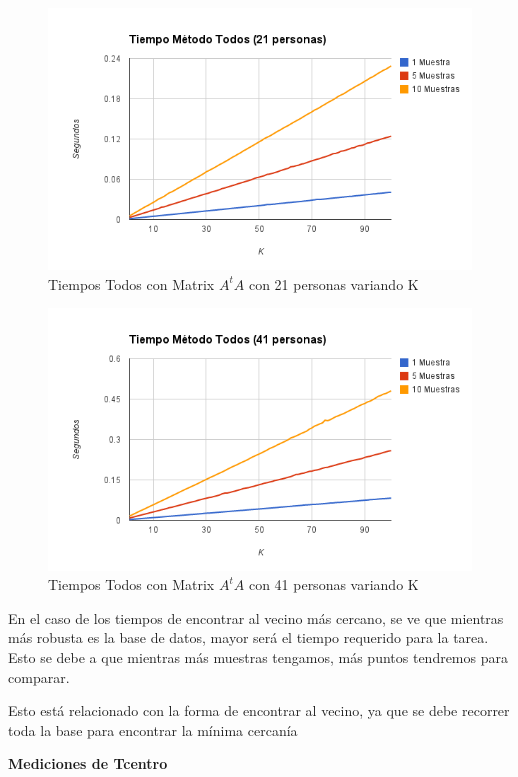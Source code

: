 \begin{figure}[H]
\includegraphics[width=1\textwidth]{img/image5.png}
     \caption{Tiempos Todos con Matrix $A^tA$ con 21 personas variando K}
\end{figure}

\begin{figure}[H]
\includegraphics[width=1\textwidth]{img/image6.png}
     \caption{Tiempos Todos con Matrix $A^tA$ con 41 personas variando K}
\end{figure}

En el caso de los tiempos de encontrar al vecino más cercano, se ve que mientras m\'as robusta es la
base de datos, mayor será el tiempo requerido para la tarea. Esto se debe a que mientras m\'as
muestras tengamos, m\'as puntos tendremos para comparar.

Esto est\'a relacionado con la forma de encontrar al vecino, ya que se debe recorrer toda la base
para encontrar la m\'inima cercan\'ia

\textbf{Mediciones de Tcentro }


